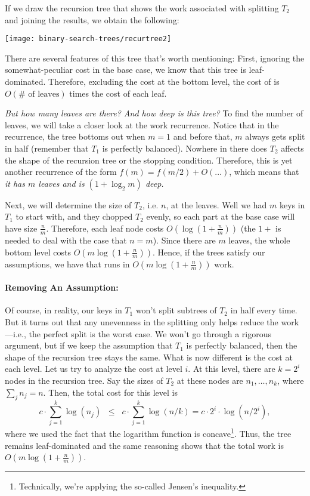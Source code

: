 If we draw the recursion tree that shows the work associated with
splitting $T_2$ and joining the results, we obtain the following:


\begin{center}
  \texttt{[image: binary-search-trees/recurtree2]}
\end{center}
%
There are several features of this tree that's worth mentioning:
First, ignoring the somewhat-peculiar cost in the base case, we know
that this tree is leaf-dominated.  Therefore, excluding the cost at
the bottom level, the cost of \cunion{} is $O(\#\text{ of leaves})$
times the cost of each leaf.

\emph{But how many leaves are there? And how deep is this tree?}  To
find the number of leaves, we will take a closer look at the work
recurrence.  Notice that in the recurrence, the tree bottoms out when
$m = 1$ and before that, $m$ always gets split in half (remember
that $T_1$ is perfectly balanced).  Nowhere in there does $T_2$
affects the shape of the recursion tree or the stopping condition.
Therefore, this is yet another recurrence of the form $f(m) = f(m/2) +
O(...)$, which means that \emph{it has $m$ leaves and is $(1 + \log_2
  m)$ deep.}

Next, we will determine the size of $T_2$, i.e. $n$, at the leaves.
Well we had $m$ keys in $T_1$ to start with, and they chopped $T_2$
evenly, so each part at the base case will have size $\frac{n}{m}$.
Therefore, each leaf node costs $O(\log (1+\frac{n}{m}))$ (the $1+$ is
needed to deal with the case that $n = m$).  Since there are $m$
leaves, the whole bottom level costs $O(m \log (1+ \frac{n}{m}))$.
Hence, if the trees satisfy our assumptions, we have that \cunion{}
runs in $ O( m\log(1 + \frac{n}{m}))$ work.

\paragraph{Removing An Assumption:} Of course, in reality, our keys in $T_1$
won't split subtrees of $T_2$ in half every time.  But it turns out
that any unevenness in the splitting only helps reduce the
work---i.e., the perfect split is the worst case.  We won't go through
a rigorous argument, but if we keep the assumption that $T_1$ is
perfectly balanced, then the shape of the recursion tree stays the
same.  What is now different is the cost at each level.  Let us try to
analyze the cost at level $i$.  At this level, there are $k = 2^i$
nodes in the recursion tree. Say the sizes of $T_2$ at these nodes are
$n_1, \dots, n_k$, where $\sum_j n_j = n$. Then, the total cost for
this level is
\[
c \cdot \sum_{j=1}^k \log (n_j) \;\;\leq\;\; c \cdot \sum_{j=1}^k \log (n/k) =
c\cdot 2^i \cdot \log (n/2^i),
\]
where we used the fact that the logarithm function is
concave\footnote{Technically, we're applying the so-called Jensen's
  inequality.}.  Thus, the tree remains leaf-dominated and the same
reasoning shows that the total work is $O(m \log (1 + \frac{n}{m}))$.

